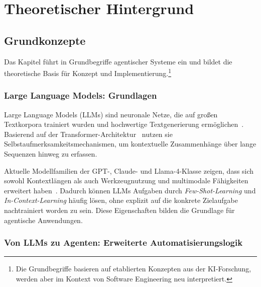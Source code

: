 
\chapter{Theoretischer Hintergrund}
\label{ch:hintergrund}%
%
%
%

\section{Grundkonzepte}

Das Kapitel führt in Grundbegriffe agentischer Systeme ein und bildet die theoretische Basis für Konzept und Implementierung.\footnote{Die Grundbegriffe basieren auf etablierten Konzepten aus der KI-Forschung, werden aber im Kontext von Software Engineering neu interpretiert.}

\subsection{Large Language Models: Grundlagen}

Large Language Models (LLMs) sind neuronale Netze, die auf großen Textkorpora trainiert wurden und hochwertige Textgenerierung ermöglichen~\cite{OpenAI2024GPT4,touvron2023llama}. Basierend auf der Transformer-Architektur~\cite{vaswani2017attention} nutzen sie Selbstaufmerksamkeitsmechanismen, um kontextuelle Zusammenhänge über lange Sequenzen hinweg zu erfassen.

Aktuelle Modellfamilien der GPT-, Claude- und Llama-4-Klasse zeigen, dass sich sowohl Kontextlängen als auch Werkzeugnutzung und multimodale Fähigkeiten erweitert haben~\cite{meta2025llama4}. Dadurch können LLMs Aufgaben durch \emph{Few-Shot-Learning} und \emph{In-Context-Learning} häufig lösen, ohne explizit auf die konkrete Zielaufgabe nachtrainiert worden zu sein. Diese Eigenschaften bilden die Grundlage für agentische Anwendungen.

\subsection{Von LLMs zu Agenten: Erweiterte Automatisierungslogik}


